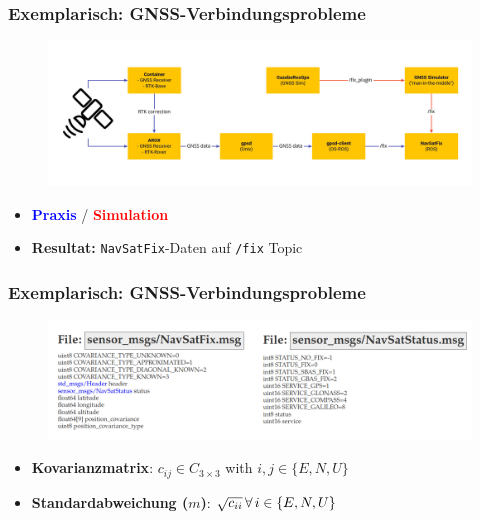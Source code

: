 \documentclass{beamer}
\newcommand{\code}[1]{\colorbox{light-gray}{\texttt{#1}}}
\begin{document}
\begin{frame}
  \frametitle{Exemplarisch: GNSS-Verbindungsprobleme}
  \begin{figure}[H]
    \centering
    \includegraphics[width=\textwidth]{img/GNSS_comm.png}
  \end{figure}
  \begin{itemize}
    \item \textbf{\textcolor{blue}{Praxis}} / \textbf{\textcolor{red}{Simulation}}
    \item \textbf{Resultat:} \code{NavSatFix}-Daten auf \code{/fix} Topic
  \end{itemize}
\end{frame}

\begin{frame}
  \frametitle{Exemplarisch: GNSS-Verbindungsprobleme}
  \begin{figure}[H]
    \centering
    \includegraphics[width=\textwidth]{img/navsatfix.png}
  \end{figure}
  \begin{itemize}
    \item \textbf{Kovarianzmatrix}: $c_{ij} \in C_{3 \times 3}$ with $i, j \in \{E, N, U\}$
    \item \textbf{Standardabweichung ($m$)}: $\sqrt{c_{ii}} \thinspace \forall \thinspace i \in \{E, N, U\}$
  \end{itemize}
\end{frame}
\end{document}
